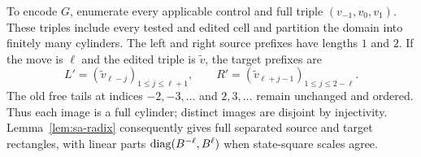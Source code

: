 To encode $G$, enumerate every applicable control and full triple
$(v_{-1},v_0,v_1)$.  These triples include every tested and edited cell
and partition the domain into finitely many cylinders.  The left and
right source prefixes have lengths $1$ and $2$.  If the move is $\ell$
and the edited triple is $\widetilde v$, the target prefixes are
\begin{equation}\label{eq:sa-neighbor-prefixes}
 L'=(\widetilde v_{\ell-j})_{1\le j\le\ell+1},\qquad
 R'=(\widetilde v_{\ell+j-1})_{1\le j\le2-\ell}.
\end{equation}
The old free tails at indices $-2,-3,\ldots$ and $2,3,\ldots$ remain
unchanged and ordered.  Thus each image is a full cylinder; distinct
images are disjoint by injectivity.  Lemma~\ref{lem:sa-radix} consequently
gives full separated source and target rectangles, with linear parts
$\operatorname{diag}(B^{-\ell},B^\ell)$ when state-square scales agree.

